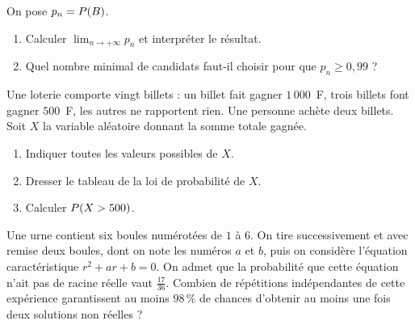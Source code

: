 \begin{annales}
On pose $p_{n} = P\!\left(B\right)$.
\begin{enumerate}[label=\textbf{\alph*)}, leftmargin=*, itemsep=0.15em]
  \item Calculer $\lim_{n\to+\infty}p_{n}$ et interpréter le résultat.
  \item Quel nombre minimal de candidats faut-il choisir pour que
        $p_{n} \geq 0{,}99$ ?
\end{enumerate}

Une loterie comporte vingt billets : un billet fait gagner $1\,000$~F, trois
billets font gagner $500$~F, les autres ne rapportent rien. Une personne
achète deux billets. Soit $X$ la variable aléatoire donnant la somme totale
gagnée.
\begin{enumerate}[label=\textbf{\alph*)}, leftmargin=*, itemsep=0.15em]
  \item Indiquer toutes les valeurs possibles de $X$.
  \item Dresser le tableau de la loi de probabilité de $X$.
  \item Calculer $P\!\left(X>500\right)$.
\end{enumerate}

Une urne contient six boules numérotées de $1$ à $6$. On tire successivement
et avec remise deux boules, dont on note les numéros $a$ et $b$, puis on
considère l'équation caractéristique $r^{2}+ar+b = 0$. On admet que la
probabilité que cette équation n'ait pas de racine réelle vaut
$\frac{17}{36}$. Combien de répétitions indépendantes de cette expérience
garantissent au moins $98\,\%$ de chances d'obtenir au moins une fois deux
solutions non réelles ?
\end{annales}

